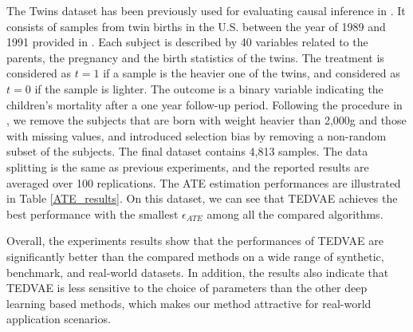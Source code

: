 \documentclass[letterpaper]{article} %
\begin{document}

The Twins dataset has been previously used for evaluating causal inference in \cite{Louizos2017,Yao2018_Twin}. It consists of samples from twin births in the U.S. between the year of 1989 and 1991 provided in \cite{Almond2005_TwinData}. Each subject is described by 40 variables related to the parents, the pregnancy and the birth statistics of the twins.
The treatment is considered as $t=1$ if a sample is the heavier one of the twins, and considered as $t=0$ if the sample is lighter.
The outcome is a binary variable indicating the children's mortality after a one year follow-up period.
Following the procedure in \cite{Yao2018_Twin}, we remove the subjects that are born with weight heavier than 2,000g and those with missing values, and introduced selection bias by removing a non-random subset of the subjects. The final dataset contains 4,813 samples. The data splitting is the same as previous experiments, and the reported results are averaged over 100 replications.
The ATE estimation performances are illustrated in Table \ref{ATE_results}.
On this dataset, we can see that TEDVAE achieves the best performance with the smallest $\epsilon_{ATE}$ among all the compared algorithms.

Overall, the experiments results show that the performances of TEDVAE are significantly better than the compared methods on a wide range of synthetic, benchmark, and real-world datasets. In addition, the results also indicate that TEDVAE is less sensitive to the choice of parameters than the other deep learning based methods, which makes our method attractive for real-world application scenarios.
\end{document}
